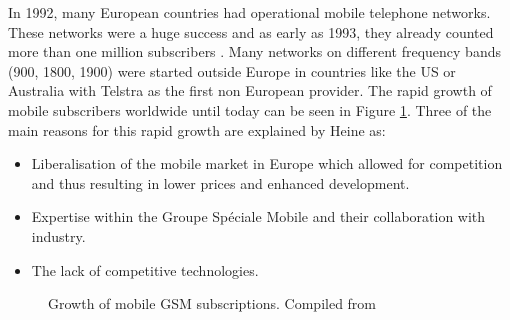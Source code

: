 In 1992, many European countries had operational mobile telephone networks.
These networks were a huge success and as early as 1993, they already counted more than one million subscribers \cite{GSM2009}.
Many networks on different frequency bands (900\MHz, 1800\MHz, 1900\MHz) were started outside Europe in countries like the US or Australia with Telstra as the first non European provider.
The rapid growth of mobile subscribers worldwide until today can be seen in Figure \ref{fig:gsm_growth}.
Three of the main reasons for this rapid growth are explained by Heine \cite{protocols1999} as:
\begin{itemize}
	\item Liberalisation of the mobile market in Europe which allowed for competition and thus resulting in lower prices and enhanced development.
	\item Expertise within the Groupe Sp\'{e}ciale Mobile and their collaboration with industry.
	\item The lack of competitive technologies.
\end{itemize}

\begin{figure}
\centering
{}
\caption{Growth of mobile GSM subscriptions. Compiled from \cite{GSM2009,GSM_history2011,GSM_stats2011}}
\label{fig:gsm_growth}
\end{figure}


